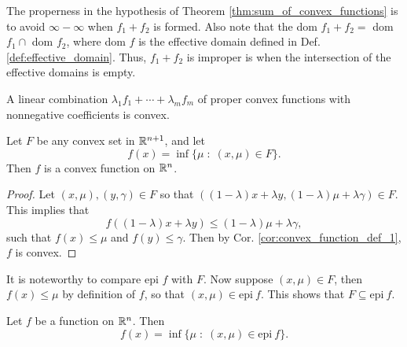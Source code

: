 \documentclass[11pt,a4paper]{article}
\begin{document}
\begin{remark}
    The properness in the hypothesis of Theorem \ref{thm:sum_of_convex_functions} is to avoid $\infty-\infty$ when $f_1+f_2$ is formed. Also note that the dom $f_1+f_2 =$ dom $f_1\cap$ dom $f_2$, where dom $f$ is the effective domain defined in Def. \ref{def:effective_domain}. Thus, $f_1+f_2$ is improper is when the intersection of the effective domains is empty. 
\end{remark}

\begin{corollary}
    A linear combination $\lambda_1 f_1+\cdots + \lambda_m f_m$ of proper convex functions with nonnegative coefficients is convex.
\end{corollary}

\begin{theorem}\label{thm:convex_set_inf_convex_function}
    Let $F$ be any convex set in $\mathbb{R}^{n+1}$, and let 
    \begin{equation*}
        f(x) = \inf\{\mu\;:\;(x,\mu)\in F\}.
    \end{equation*}
    Then $f$ is a convex function on $\mathbb{R}^n$.
\end{theorem}

\begin{proof}
    Let $(x,\mu),(y,\gamma)\in F$ so that $((1-\lambda)x+\lambda y, (1-\lambda)\mu+\lambda \gamma)\in F$. This implies that
    \begin{equation}\label{eqn:}
        f((1-\lambda)x+\lambda y) \le (1-\lambda)\mu+\lambda \gamma,
    \end{equation} 
    such that $f(x)\le \mu$ and $f(y)\le \gamma$. Then by Cor. \ref{cor:convex_function_def_1}, $f$ is convex.
\end{proof}

\begin{remark}
    It is noteworthy to compare epi $f$ with $F$. Now suppose $(x,\mu)\in F$, then $f(x)\le \mu$ by definition of $f$, so that $(x,\mu)\in \text{epi}\ f$. This shows that $F\subseteq \text{epi}\ f$. 
\end{remark}

\begin{proposition}\label{prop:f_inf_epi_f}
    Let $f$ be a function on $\mathbb{R}^n$. Then
    \begin{equation*}
        f(x) = \inf \{\mu\;:\;(x,\mu)\in \text{epi}\ f\}.
    \end{equation*}
\end{proposition}
\end{document}
